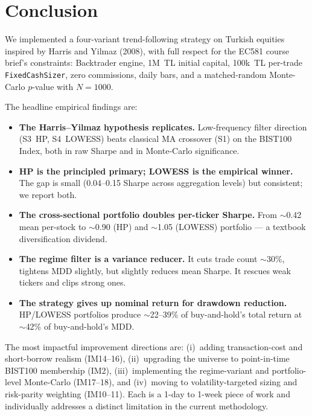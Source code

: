 \documentclass[11pt,a4paper]{article}
\begin{document}
\section{Conclusion}

We implemented a four-variant trend-following strategy on Turkish equities
inspired by Harris and Yilmaz (2008), with full respect for the EC581 course
brief's constraints: Backtrader engine, 1M~TL initial capital, 100k~TL
per-trade \texttt{FixedCashSizer}, zero commissions, daily bars, and a
matched-random Monte-Carlo $p$-value with $N{=}1000$.

The headline empirical findings are:

\begin{itemize}[leftmargin=1.5em,itemsep=2pt]
    \item \textbf{The Harris--Yilmaz hypothesis replicates.} Low-frequency
          filter direction (S3~HP, S4~LOWESS) beats classical MA crossover
          (S1) on the BIST100 Index, both in raw Sharpe and in Monte-Carlo
          significance.
    \item \textbf{HP is the principled primary; LOWESS is the empirical
          winner.} The gap is small (0.04--0.15 Sharpe across aggregation
          levels) but consistent; we report both.
    \item \textbf{The cross-sectional portfolio doubles per-ticker Sharpe.}
          From $\sim$0.42 mean per-stock to $\sim$0.90 (HP) and $\sim$1.05
          (LOWESS) portfolio --- a textbook diversification dividend.
    \item \textbf{The regime filter is a variance reducer.} It cuts trade
          count $\sim$30\%, tightens MDD slightly, but slightly reduces mean
          Sharpe. It rescues weak tickers and clips strong ones.
    \item \textbf{The strategy gives up nominal return for drawdown
          reduction.} HP/LOWESS portfolios produce $\sim$22--39\% of
          buy-and-hold's total return at $\sim$42\% of buy-and-hold's MDD.
\end{itemize}

The most impactful improvement directions are: (i)~adding transaction-cost
and short-borrow realism (IM14--16), (ii)~upgrading the universe to
point-in-time BIST100 membership (IM2), (iii)~implementing the regime-variant
and portfolio-level Monte-Carlo (IM17--18), and (iv)~moving to
volatility-targeted sizing and risk-parity weighting (IM10--11). Each is a
1-day to 1-week piece of work and individually addresses a distinct
limitation in the current methodology.
\end{document}

